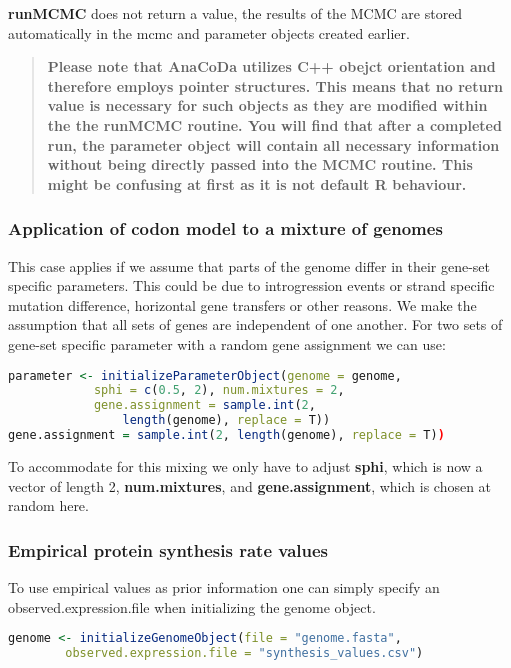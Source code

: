 \textbf{runMCMC} does not return a value, the results of the MCMC are stored automatically in the mcmc and parameter
objects created earlier.

\begin{quote}
\textbf{Please note that AnaCoDa utilizes C++ obejct orientation and therefore employs pointer structures. 
This means that no return value is necessary for such objects as they are modified within the the runMCMC routine. 
You will find that after a completed run, the parameter object will contain all necessary information without being directly passed into the MCMC routine. 
This might be confusing at first as it is not default R behaviour.}
\end{quote}

\subsubsection{Application of codon model to a mixture of genomes}
This case applies if we assume that parts of the genome differ in their gene-set specific parameters. 
This could be due to introgression events or strand specific mutation difference, horizontal gene transfers or other reasons. 
We make the assumption that all sets of genes are independent of one another. 
For two sets of gene-set specific parameter with a random gene assignment we can use:

\begin{lstlisting}[language=R]
parameter <- initializeParameterObject(genome = genome, 
			sphi = c(0.5, 2), num.mixtures = 2,
			gene.assignment = sample.int(2, 
				length(genome), replace = T))
gene.assignment = sample.int(2, length(genome), replace = T))
\end{lstlisting}

To accommodate for this mixing we only have to adjust \textbf{sphi}, which is now a vector of length 2, \textbf{num.mixtures},
and \textbf{gene.assignment}, which is chosen at random here.

\subsubsection{Empirical protein synthesis rate values}
To use empirical values as prior information one can simply specify an observed.expression.file when
initializing the genome object.

\begin{lstlisting}[language=R]
genome <- initializeGenomeObject(file = "genome.fasta",
		observed.expression.file = "synthesis_values.csv")
\end{lstlisting}

